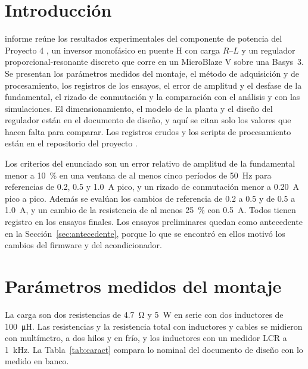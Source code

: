 \documentclass[journal]{IEEEtran}
\begin{document}
\section{Introducción}
\label{sec:intro}
 informe reúne los resultados experimentales del componente de potencia del Proyecto 4 \cite{enunciado}, un inversor monofásico en puente H con carga $R$--$L$ y un regulador proporcional-resonante discreto \cite{teodorescu2006} que corre en un MicroBlaze V sobre una Basys~3. Se presentan los parámetros medidos del montaje, el método de adquisición y de procesamiento, los registros de los ensayos, el error de amplitud y el desfase de la fundamental, el rizado de conmutación y la comparación con el análisis y con las simulaciones. El dimensionamiento, el modelo de la planta y el diseño del regulador están en el documento de diseño, y aquí se citan solo los valores que hacen falta para comparar. Los registros crudos y los scripts de procesamiento están en el repositorio del proyecto \cite{repositorio}.

Los criterios del enunciado \cite{enunciado} son un error relativo de amplitud de la fundamental menor a \SI{10}{\percent} en una ventana de al menos cinco períodos de \SI{50}{Hz} para referencias de \num{0.2}, \num{0.5} y \SI{1.0}{A} pico, y un rizado de conmutación menor a \SI{0.20}{A} pico a pico. Además se evalúan los cambios de referencia de \num{0.2} a \num{0.5} y de \num{0.5} a \SI{1.0}{A}, y un cambio de la resistencia de al menos \SI{25}{\percent} con \SI{0.5}{A}. Todos tienen registro en los ensayos finales. Los ensayos preliminares quedan como antecedente en la Sección~\ref{sec:antecedente}, porque lo que se encontró en ellos motivó los cambios del firmware y del acondicionador.

\section{Parámetros medidos del montaje}
\label{sec:caract}
La carga son dos resistencias de \SI{4.7}{\ohm} y \SI{5}{W} en serie con dos inductores de \SI{100}{\micro H}. Las resistencias y la resistencia total con inductores y cables se midieron con multímetro, a dos hilos y en frío, y los inductores con un medidor LCR a \SI{1}{kHz}. La Tabla~\ref{tab:caract} compara lo nominal del documento de diseño con lo medido en banco.
\end{document}
